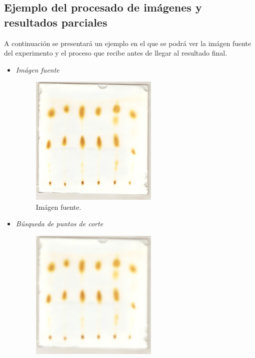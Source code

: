 \subsection{Ejemplo del procesado de im\'agenes y resultados parciales}
A continuaci\'on se presentar\'a un ejemplo en el que se podr\'a ver la im\'agen fuente del experimento y el proceso que recibe antes de llegar al resultado final.
\begin{itemize}
	\renewcommand{\labelitemi}{$\bullet$}
	\renewcommand{\labelitemii}{$\circ$}
	
	\item \textit{Im\'agen fuente}
	\begin{figure}[H]
	  \vspace{-0.2cm}
	  \centering
	  \includegraphics[width=230px]{imagenes-jtlc/experimento/fuente}
	  \centering
	  \vspace{-0.4cm}
	  \caption{Im\'agen fuente.}
	  \label{fig:image-font}
	  \vspace{-0.15cm}
	\end{figure}
	\newpage
	\item \textit{B\'usqueda de puntos de corte}
	\begin{figure}[H]
	  \vspace{-0.2cm}
	  \centering
	  \includegraphics[width=230px]{imagenes-jtlc/experimento/search-cut-points/1-blur}

\end{figure}
\end{itemize}
